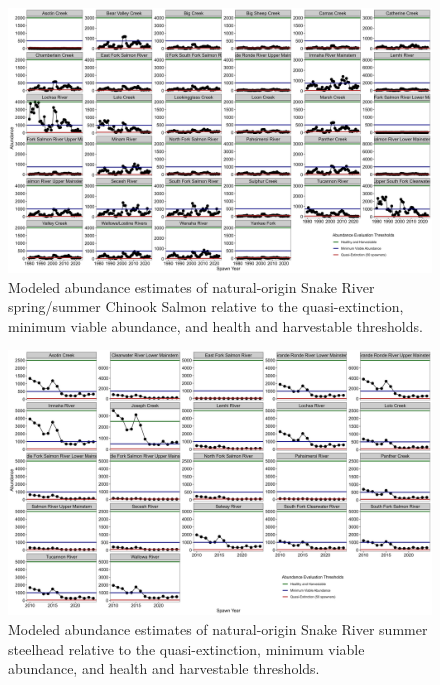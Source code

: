 \documentclass[12pt,a4paper]{article}
\begin{document}
\begin{figure}
\includegraphics[width=1\linewidth]{../figures/Chinook_salmon/Chinook_salmon_pop_thresholds_2024} \caption{Modeled abundance estimates of natural-origin Snake River spring/summer Chinook Salmon relative to the quasi-extinction, minimum viable abundance, and health and harvestable thresholds.}\label{fig:chn-targets}
\end{figure}

\begin{figure}
\includegraphics[width=1\linewidth]{../figures/Steelhead/Steelhead_pop_thresholds_2024} \caption{Modeled abundance estimates of natural-origin Snake River summer steelhead relative to the quasi-extinction, minimum viable abundance, and health and harvestable thresholds.}\label{fig:sth-targets}
\end{figure}

\printbibliography
\end{document}
